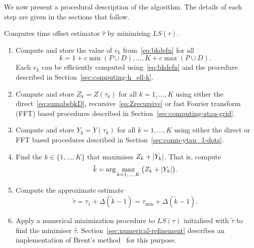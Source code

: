 \documentclass[journal]{IEEEtranTCOM}
\begin{document}


We now present a procedural description of the algorithm.  The details of each step are given in the sections that follow.

\begin{algorithm}\label{alg:algorithm}
Computes time offset estimator $\hat{\tau}$ by minimising $LS(\tau)$.
\begin{enumerate}
\item \label{computebgk} Compute and store the value of $v_k$ from~\eqref{eq:bkdefn} for all  
\[
k = 1 + c\min(P \cup D), \dots, K + c\max(P \cup D).
\]  
Each $v_k$ can be efficiently computed using~\eqref{eq:bkdefn} and the procedure described in Section~\ref{sec:computing-h_ell-k}.
\item \label{compZk} Compute and store $Z_k = Z(\tau_k)$ for all $k = 1,\dots, K$ using either the direct~\eqref{eq:sumabsbkD}, recursive~\eqref{eq:Zrecursive} or fast Fourier transform (FFT) based procedures described in Section~\ref{sec:computing-ztau-grid}. 
\item \label{compYk} Compute and store $Y_k = Y(\tau_k)$ for all $k = 1,\dots, K$ using either the direct or FFT based procedures described in Section~\ref{sec:comp-ytau_1-dots}.
\item \label{compmaxk} Find the $k \in \{1, \dots, K\}$ that maximises $Z_k + {\left\vert Y_k \right\vert}$.  That is, compute
\[
\tilde{k} = \arg\max_{k = 1, \dots, K} \big( Z_k + {\left\vert Y_k \right\vert} \big).
\]
\item \label{comptotime} Compute the approximate estimate
\[
\tilde{\tau} = \tau_1 + \Delta (\tilde{k}-1) = \tau_{\text{min}} + \Delta (\tilde{k}-1).
\]
\item \label{compbrent} Apply a numerical minimisation procedure to $LS(\tau)$ initialised with $\tilde{\tau}$ to find the minimiser $\hat{\tau}$.  Section~\ref{sec:numerical-refinement} describes an implementation of Brent's method~\cite{Brent_opt_no_derivs_1973} for this purpose.
\end{enumerate}
\end{algorithm}
\end{document}
